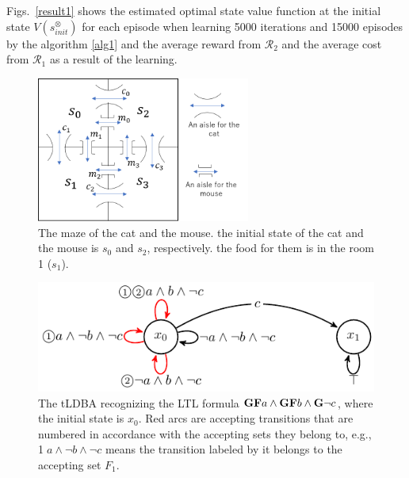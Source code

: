 \documentclass[letterpaper, 10 pt, conference]{ieeeconf}
\begin{document}
Figs.\ \ref{result1} shows the estimated optimal state value function at the initial state $V(s^{\otimes}_{init})$ for each episode when learning 5000 iterations and 15000 episodes by the algorithm \ref{alg1} and the average reward from $\mathcal{R}_2$ and the average cost from $\mathcal{R}_1$ as a result of the learning.

\begin{figure}[htbp]
   \centering
   \vspace{2mm}
   \includegraphics[width=7cm]{cat_mouse.png}
   \caption{The maze of the cat and the mouse. the initial state of the cat and the mouse is $s_0$ and $s_2$, respectively. the food for them is in the room 1 ($s_1$).}
   \label{cat_mouse}
\end{figure}

\begin{figure}[htbp]
   \centering
   \vspace{2mm}
   \includegraphics[bb=0 0 247 80,scale=0.85]{ldgba_original.pdf}
   \caption{The tLDBA recognizing the LTL formula $\text{{\bf GF}}a \wedge \text{{\bf GF}}b \wedge \text{{\bf G}}\neg c$, where the initial state is $x_0$. Red arcs are accepting transitions that are numbered in accordance with the accepting sets they belong to, e.g., \textcircled{\scriptsize 1}$a \land \neg b \land \neg c$ means the transition labeled by it belongs to the accepting set $F_1$.}
   \label{tldba}
\end{figure}
\end{document}

